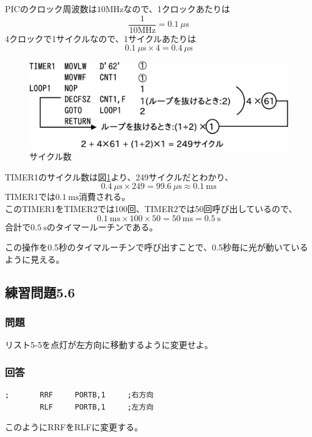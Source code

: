 \documentclass[a4paper,12pt]{ujarticle}
\begin{document}
  PICのクロック周波数は$10\si{\mega\hertz}$なので、1クロックあたりは
    \[
     \frac{1}{10\si{\mega\hertz}} = \SI{0.1}{\mu\second}
    \]
    4クロックで1サイクルなので、1サイクルあたりは
    \[
     \SI{0.1}{\mu\second} \times 4 = \SI{0.4}{\mu\second}
    \]
     \begin{figure}[htbp]
      \begin{center}
       \includegraphics[width=130mm]{Diagram5.eps}
      \end{center}
      \caption{サイクル数}
      \label{fig:sicle}
     \end{figure}
     TIMER1のサイクル数は図\ref{fig:sicle}より、249サイクルだとわかり、
     \[
      \SI{0.4}{\mu\second} \times 249 = \SI{99.6}{\mu\second} \approx \SI{0.1}{\milli\second}
     \]
     TIMER1では$\SI{0.1}{\milli\second}$消費される。\\
     このTIMER1をTIMER2では100回、TIMER2では50回呼び出しているので、
     \[
      \SI{0.1}{\milli\second} \times 100 \times 50 = \SI{50}{\milli\second} = \SI{0.5}{\second}
     \]
     合計で$\SI{0.5}{\second}$のタイマールーチンである。

     この操作を0.5秒のタイマルーチンで呼び出すことで、0.5秒毎に光が動いているように見える。
  \subsection{練習問題5.6}
     \subsubsection{問題}
     リスト5-5を点灯が左方向に移動するように変更せよ。
     \subsubsection{回答}
  \begin{lstlisting}[basicstyle=\ttfamily\footnotesize, frame=single]
;       RRF     PORTB,1     ;右方向
        RLF     PORTB,1     ;左方向
  \end{lstlisting}
  このようにRRFをRLFに変更する。
\end{document}
